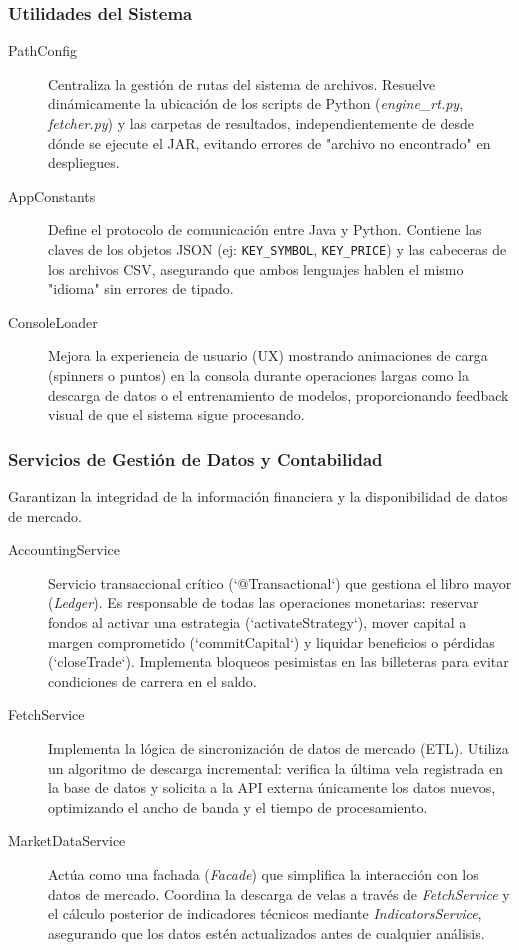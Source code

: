 \documentclass[12pt, letterpaper]{article}
\begin{document}
\subsubsection{Utilidades del Sistema}
\begin{description}
    \item[PathConfig] Centraliza la gestión de rutas del sistema de archivos. Resuelve dinámicamente la ubicación de los scripts de Python (\textit{engine\_rt.py}, \textit{fetcher.py}) y las carpetas de resultados, independientemente de desde dónde se ejecute el JAR, evitando errores de "archivo no encontrado" en despliegues.
    
    \item[AppConstants] Define el protocolo de comunicación entre Java y Python. Contiene las claves de los objetos JSON (ej: \texttt{KEY\_SYMBOL}, \texttt{KEY\_PRICE}) y las cabeceras de los archivos CSV, asegurando que ambos lenguajes hablen el mismo "idioma" sin errores de tipado.
    
    \item[ConsoleLoader] Mejora la experiencia de usuario (UX) mostrando animaciones de carga (spinners o puntos) en la consola durante operaciones largas como la descarga de datos o el entrenamiento de modelos, proporcionando feedback visual de que el sistema sigue procesando.
\end{description}

\subsubsection{Servicios de Gestión de Datos y Contabilidad}
Garantizan la integridad de la información financiera y la disponibilidad de datos de mercado.

\begin{description}
    \item[AccountingService] Servicio transaccional crítico (`@Transactional`) que gestiona el libro mayor (\textit{Ledger}). Es responsable de todas las operaciones monetarias: reservar fondos al activar una estrategia (`activateStrategy`), mover capital a margen comprometido (`commitCapital`) y liquidar beneficios o pérdidas (`closeTrade`). Implementa bloqueos pesimistas en las billeteras para evitar condiciones de carrera en el saldo.

    \item[FetchService] Implementa la lógica de sincronización de datos de mercado (ETL). Utiliza un algoritmo de descarga incremental: verifica la última vela registrada en la base de datos y solicita a la API externa únicamente los datos nuevos, optimizando el ancho de banda y el tiempo de procesamiento.

    \item[MarketDataService] Actúa como una fachada (\textit{Facade}) que simplifica la interacción con los datos de mercado. Coordina la descarga de velas a través de \textit{FetchService} y el cálculo posterior de indicadores técnicos mediante \textit{IndicatorsService}, asegurando que los datos estén actualizados antes de cualquier análisis.
\end{description}
\end{document}
